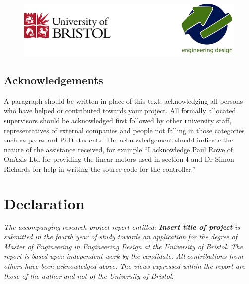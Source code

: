 \documentclass[a4paper, 10pt]{article}
\author{\university}
\title{
\vspace{-1.5in}
\textmd{\textbf{\DocumentTitle}}
\vspace{0.1in}
}
\numberwithin{equation}{section}
\begin{document}
\begin{figure}
    \centering
    \includegraphics[width = \textwidth]{images/Logos.png}
\end{figure}

\maketitle

\begin{center}
\section*{Acknowledgements}
\end{center}
A paragraph should be written in place of this text, acknowledging all persons who have helped or contributed towards your project. All formally allocated supervisors should be acknowledged first followed by other university staff, representatives of external companies and people not falling in those categories such as peers and PhD students. The acknowledgement should indicate the nature of the assistance received, for example “I acknowledge Paul Rowe of OnAxis Ltd for providing the linear motors used in section 4 and Dr Simon Richards for help in writing the source code for the controller.”
\vspace{0.35in}
\section*{Declaration}
\vspace{0.25in}
\begin{center}
\begin{minipage}[c]{0.8\textwidth}
\it{The accompanying research project report entitled:  \textbf{Insert title of project} is submitted in the fourth year of study towards an application for the degree of Master of Engineering in Engineering Design at the University of Bristol. The report is based upon independent work by the candidate. All contributions from others have been acknowledged above. The views expressed within the report are those of the author and not of the University of Bristol.}
\end{minipage}
\end{center}
\vspace{0.35in}
\end{document}

